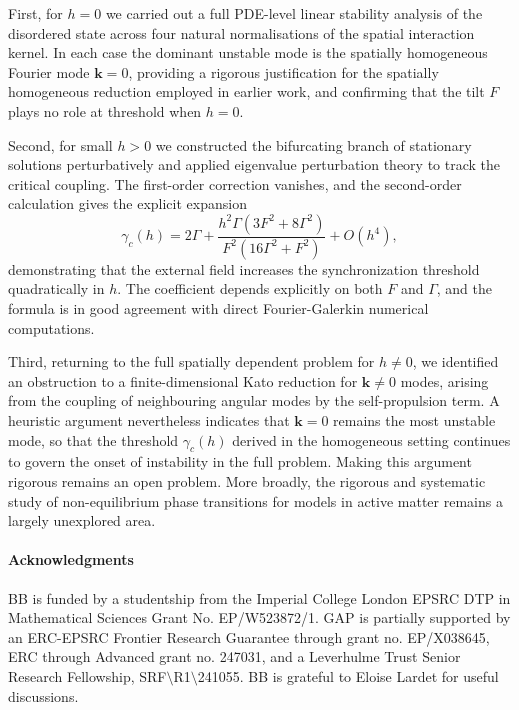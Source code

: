 \documentclass[a4paper,11pt]{article}
\theoremstyle{plain}
\theoremstyle{definition}
\theoremstyle{remark}
\newcommand{\bk}{\mathbf{k}}
\begin{document}
First, for $h=0$ we carried out a full PDE-level linear stability analysis of the disordered state across four natural normalisations of the spatial interaction kernel. In each case the dominant unstable mode is the spatially homogeneous Fourier mode $\bk = 0$, providing a rigorous justification for the spatially homogeneous reduction employed in earlier work, and confirming that the tilt $F$ plays no role at threshold when $h=0$.

Second, for small $h>0$ we constructed the bifurcating branch of stationary solutions perturbatively and applied eigenvalue perturbation theory to track the critical coupling. The first-order correction vanishes, and the second-order calculation gives the explicit expansion
\begin{equation}
    \gamma_c(h) = 2\Gamma + \frac{h^2 \Gamma(3F^2 + 8\Gamma^2)}{F^2(16\Gamma^2 + F^2)} + O(h^4),
\end{equation}
demonstrating that the external field increases the synchronization threshold quadratically in $h$. The coefficient depends explicitly on both $F$ and $\Gamma$, and the formula is in good agreement with direct Fourier-Galerkin numerical computations.

Third, returning to the full spatially dependent problem for $h \neq 0$, we identified an obstruction to a finite-dimensional Kato reduction for $\bk \neq 0$ modes, arising from the coupling of neighbouring angular modes by the self-propulsion term. A heuristic argument nevertheless indicates that $\bk = 0$ remains the most unstable mode, so that the threshold $\gamma_c(h)$ derived in the homogeneous setting continues to govern the onset of instability in the full problem. Making this argument rigorous remains an open problem. More broadly, the rigorous and systematic study of non-equilibrium phase transitions for models in active matter remains a largely unexplored area.

\paragraph{Acknowledgments} BB is funded by a studentship from the Imperial College London EPSRC DTP in Mathematical Sciences Grant No. EP/W523872/1. GAP is partially supported by an ERC-EPSRC Frontier Research
Guarantee through grant no. EP/X038645, ERC through Advanced grant no. 247031, and a Leverhulme Trust Senior Research Fellowship, SRF{$\setminus$}R1{$\setminus$}241055. BB is grateful to Eloise Lardet for useful discussions.

\printbibliography
\end{document}
